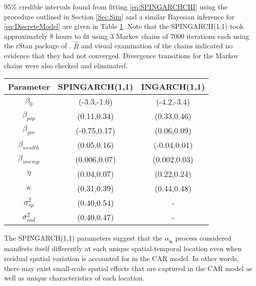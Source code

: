\documentclass[11pt]{isuthesis}
\begin{document}
95\% credible intervals found from fitting \eqref{eq:SPINGARCHCHI} using the procedure outlined in Section \ref{Sec:Sim} and a similar Bayesian inference for \eqref{eq:DiscreteModel} are given in Table \ref{Table:ResultsChi}.  Note that the SPINGARCH(1,1) took approximately 8 hours to fit using 3 Markov chains of 7000 iterations each using the rStan package of \cite{carpenter2016stan}.  $\hat{R}$ and visual examination of the chains indicated no evidence that they had not converged.  Divergence transitions for the Markov chains were also checked and eliminated.


\begin{table}[!htp]
	\begin{center}
		\begin{tabular}{ |c|c|c| } 
			\hline
			Parameter & SPINGARCH(1,1) & INGARCH(1,1) \\
			\hline 
			$\beta_0$ & (-3.3,-1.0) & (-4.2,-3.4) \\
			$\beta_{pop}$ & (0.11,0.34) & (0.33,0.46)\\
			$\beta_{ym}$ & (-0.75,0.17)& (0.06,0.09)\\
			$\beta_{wealth}$&(0.05,0.16) & (-0.04,0.01)\\
			$\beta_{unemp}$ & (0.006,0.07)& (0.002,0.03) \\
			$\eta$ & (0.04,0.07) & (0.22,0.24)\\
			$\kappa$ & (0.31,0.39)& (0.44,0.48)\\
			$\sigma_{sp}^2$ & (0.40,0.54) & - \\
			$\sigma_{ind}^2$& (0.40,0.47)& - \\
			\hline
		\end{tabular}
	\end{center}
	\label{Table:ResultsChi}
\end{table}

The SPINGARCH(1,1) parameters suggest that the $\alpha_{\boldsymbol{s_i}}$ process considered manifests itself differently at each unique spatial-temporal location even when residual spatial variation is accounted for in the CAR model.  In other words, there may exist small-scale spatial effects that are captured in the CAR model as well as unique characteristics of each location.
  
\end{document}
